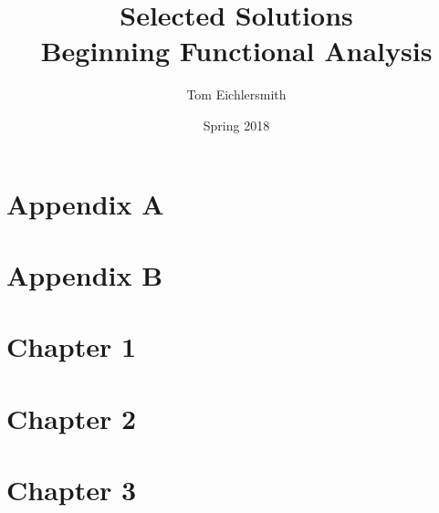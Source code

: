 \documentclass{article}
\title{Selected Solutions \\ Beginning Functional Analysis}
\author{Tom Eichlersmith}
\date{Spring 2018}
\begin{document}
 
\maketitle
 
\section*{Appendix A}
 


\section*{Appendix B}



\section*{Chapter 1}



\section*{Chapter 2}



\section*{Chapter 3}


\end{document}
